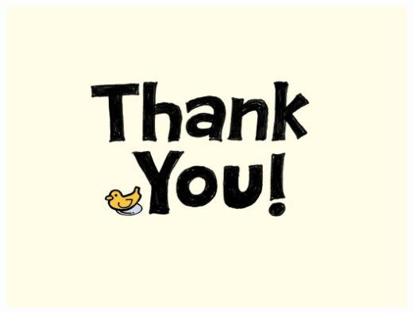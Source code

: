\documentclass{beamer}
\begin{document}
\begin{CJK}{UTF8}{bkai}
\begin{frame}
	\begin{center}
	\includegraphics[width=\textwidth]{thank_you.jpg}
	\end{center}	
\end{frame}
\end{CJK}
\end{document}
